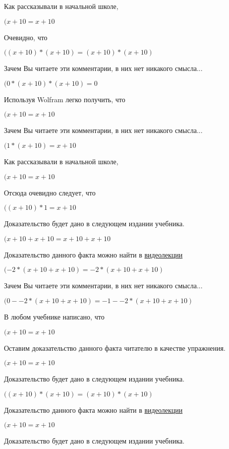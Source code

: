 \documentclass[12pt,a4paper,fleqn]{article}
\theoremstyle{definition}
\begin{document}
Как рассказывали в начальной школе,

$( x  +  10  =  x  +  10 $

Очевидно, что

$(( x  +  10 ) * ( x  +  10 ) = ( x  +  10 ) * ( x  +  10 )$

Зачем Вы читаете эти комментарии, в них нет никакого смысла...

$( 0  * ( x  +  10 ) * ( x  +  10 ) =  0 $

Используя Wolfram легко получить, что

$( x  +  10  =  x  +  10 $

Зачем Вы читаете эти комментарии, в них нет никакого смысла...

$( 1  * ( x  +  10 ) =  x  +  10 $

Как рассказывали в начальной школе,

$( x  +  10  =  x  +  10 $

Отсюда очевидно следует, что

$(( x  +  10 ) *  1  =  x  +  10 $

Доказательство будет дано в следующем издании учебника.

$( x  +  10  +  x  +  10  =  x  +  10  +  x  +  10 $

Доказательство данного факта можно найти в \href{https://www.youtube.com/watch?v=dQw4w9WgXcQ}{видеолекции}

$( -2  * ( x  +  10  +  x  +  10 ) =  -2  * ( x  +  10  +  x  +  10 )$

Зачем Вы читаете эти комментарии, в них нет никакого смысла...

$( 0  -  -2  * ( x  +  10  +  x  +  10 ) =  -1  -  -2  * ( x  +  10  +  x  +  10 )$

В любом учебнике написано, что

$( x  +  10  =  x  +  10 $

Оставим доказательство данного факта читателю в качестве упражнения.

$( x  +  10  =  x  +  10 $

Доказательство будет дано в следующем издании учебника.

$(( x  +  10 ) * ( x  +  10 ) = ( x  +  10 ) * ( x  +  10 )$

Доказательство данного факта можно найти в \href{https://www.youtube.com/watch?v=dQw4w9WgXcQ}{видеолекции}

$( x  +  10  =  x  +  10 $

Доказательство будет дано в следующем издании учебника.
\end{document}
